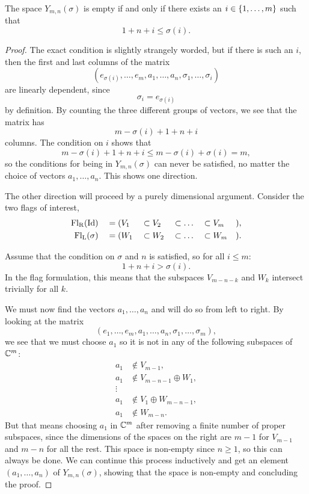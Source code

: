 \begin{theorem}
  \label{thm:ikke-tom}
  The space $Y_{m,n}(\sigma)$ is empty if and only if there exists an
  $i \in \left\{ 1,\dots,m \right\}$ such that
  \[ 1 + n + i \leq \sigma(i). \]
\end{theorem}
\begin{proof}
  The exact condition is slightly strangely worded, but if there is
  such an $i$, then the first and last columns of the matrix
  \[ (e_{\sigma(i)},\dots,e_m,a_1,\dots,a_n,\sigma_1,\dots,\sigma_i) \]
  are linearly dependent, since
  \[ \sigma_i = e_{\sigma(i)} \]
  by definition. By counting the three different groups of vectors, we
  see that the matrix has
  \[ m - \sigma(i) + 1 + n + i \]
  columns. The condition on $i$ shows that
  \[ m - \sigma(i) + 1 + n + i \leq m - \sigma(i) + \sigma(i) = m, \]
  so the conditions for being in $Y_{m,n}(\sigma)$ can never be
  satisfied, no matter the choice of vectors $a_1,\dots,a_n$. This
  shows one direction.

  The other direction
  will proceed by a purely dimensional argument. Consider the two
  flags of interest,
  \begin{alignat*}{6}
    \mathrm{Fl_R}(\operatorname{Id}) &&\;= (&V_1 &&\subset V_2 &&\subset \dots
    &&\subset V_m&&), \\
    \mathrm{Fl_L}(\sigma) &&\;= (&W_1 &&\subset W_2 &&\subset \dots
    &&\subset  W_m&&).
  \end{alignat*}

  Assume that the condition on $\sigma$ and $n$ is satisfied, so for
  all $i \leq m$:
  \[ 1 + n + i > \sigma(i). \]
  In the flag formulation, this means that the subspaces $V_{m-n-k}$
  and $W_k$ intersect trivially for all $k$.

  We must now find the vectors $a_1,\dots,a_n$ and will do so from
  left to right. By looking at the matrix
  \[ \left( e_1, \dots, e_m, a_1, \dots, a_n, \sigma_1, \dots,
    \sigma_m \right), \]
  we see that we must choose $a_1$ so it is not in any of the
  following subspaces of $\mathbb{C}^m$:
  \begin{align*}
    a_1 &\not\in V_{m-1}, \\
    a_1 &\not\in V_{m-n-1} \oplus W_1, \\
    \vdots & \\
    a_1 &\not\in V_1\oplus W_{m-n-1}, \\
    a_1 &\not\in W_{m-n}.
  \end{align*}
  But that means choosing $a_1$ in $\mathbb{C}^m$ after removing a
  finite number of proper subspaces, since the dimensions of the
  spaces on the right are $m-1$ for $V_{m-1}$ and $m-n$ for
  all the rest. This space is non-empty since $n\geq 1$, so this can
  always be done. We can continue this process inductively and get an
  element $(a_1,\dots,a_n)$ of $Y_{m,n}(\sigma)$, showing that the
  space is non-empty and concluding the proof.
\end{proof}
